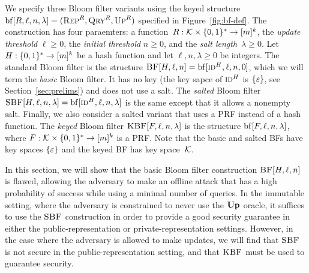 \medskip
We specify three Bloom filter variants using the keyed structure
$\mathrm{bf}[R,\ell,n,\lambda] = (\textnormal{\textsc{Rep}}^R,\textnormal{\textsc{Qry}}^R,\textnormal{\textsc{Up}}^R)$ specified in
Figure~\ref{fig:bf-def}.
%
The construction has four paraemters: a function~$R:\mathcal{K}\times\{0,1\}^*\to[m]^k$, the
\emph{update threshold} $\ell\geq0$, the \emph{initial threshold} $n\geq0$, and
the \emph{salt length}~$\lambda\geq0$.
%
Let $H:\{0,1\}^*\to[m]^k$ be a hash function and let $\ell, n, \lambda\geq0$ be
integers.
%
The standard Bloom filter is the structure $\textnormal{\textsc{BF}}[H,\ell,n] =
\mathrm{bf}[\textnormal{\textsc{id}}^H,\ell,n,0]$, which we will term the \emph{basic} Bloom filter. It
has no key (the key sapce of $\textnormal{\textsc{id}}^H$ is $\{\varepsilon\}$, see
Section~\ref{sec:prelims}) and does not use a salt.
%
The \emph{salted} Bloom filter $\textnormal{\textsc{SBF}}[H,\ell,n,\lambda] =
\mathrm{bf}[\textnormal{\textsc{id}}^H,\ell,n,\lambda]$ is the same except that it allows a nonempty salt.
%
Finally, we also consider a salted variant that uses a PRF instead of a hash
function. The \emph{keyed} Bloom filter $\textnormal{\textsc{KBF}}[F,\ell,n,\lambda]$ is the
structure $\mathrm{bf}[F,\ell,n,\lambda]$, where $F:\mathcal{K}\times\{0,1\}^*\to[m]^k$ is a
PRF.
%
Note that the basic and salted BFs have key spaces $\{\varepsilon\}$ and the keyed
BF has key space~$\mathcal{K}$.

In this section, we will show that the basic Bloom filter construction
$\textnormal{\textsc{BF}}[H,\ell,n]$ is flawed, allowing the adversary to make an offline attack that
has a high probability of success while using a minimal number of queries. In
the immutable setting, where the adversary is constrained to never use the
$\textup{\textbf{Up}}\hspace{0.5pt}$ oracle, it suffices to use the $\textnormal{\textsc{SBF}}$ construction in order to provide a
good security guarantee in either the public-representation or
private-representation settings. However, in the case where the adversary is
allowed to make updates, we will find that $\textnormal{\textsc{SBF}}$ is not secure in the
public-representation setting, and that $\textnormal{\textsc{KBF}}$ must be used to guarantee
security.


